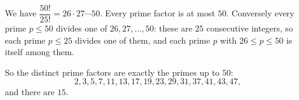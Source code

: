 We have $\dfrac{50!}{25!}=26\cdot27\cdots50$. Every prime factor is at most $50$. Conversely every prime $p\le50$ divides one of $26,27,\dots,50$: these are $25$ consecutive integers, so each prime $p\le25$ divides one of them, and each prime $p$ with $26\le p\le50$ is itself among them.

So the distinct prime factors are exactly the primes up to $50$:
\[
2,3,5,7,11,13,17,19,23,29,31,37,41,43,47,
\]
and there are $\boxed{15}$.
